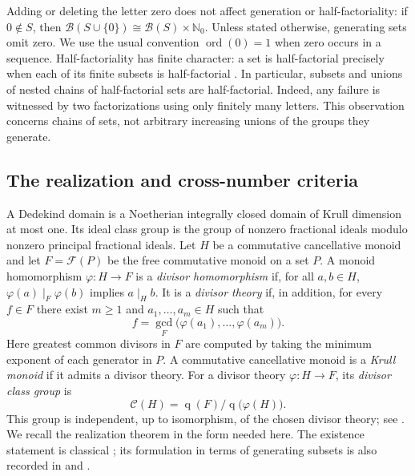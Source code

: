 \documentclass[11pt,reqno]{amsart}
\numberwithin{equation}{section}
\theoremstyle{definition}
\theoremstyle{remark}
\newcommand{\Nzero}{\mathbb N_0}
\newcommand{\B}{\mathcal B}
\DeclareMathOperator{\ord}{ord}
\begin{document}
Adding or deleting the letter zero does not affect generation or
half-factoriality: if $0\notin S$, then
$\B(S\cup\{0\})\cong\B(S)\times\Nzero$.
Unless stated otherwise, generating sets omit zero. We use the
usual convention $\ord(0)=1$ when zero occurs in a sequence.
Half-factoriality has finite character: a set is half-factorial
precisely when each of its finite subsets is half-factorial
\cite[Lemma~3.1]{GaoGeroldinger}. In particular, subsets and unions
of nested chains of half-factorial sets are half-factorial.
Indeed, any failure is witnessed by two factorizations using only
finitely many letters. This observation concerns chains of sets,
not arbitrary increasing unions of the groups they generate.

\subsection{The realization and cross-number criteria}

A Dedekind domain is a Noetherian integrally closed domain of
Krull dimension at most one. Its ideal class group is the group
of nonzero fractional ideals modulo nonzero principal fractional
ideals. 
Let $H$ be a commutative cancellative monoid and let
$F=\mathcal{F}(P)$ be the free commutative monoid on a set $P$.
A monoid homomorphism $\varphi:H\to F$ is a
\emph{divisor homomorphism} if, for all $a,b\in H$,
$\varphi(a)\mid_F\varphi(b)$ implies $a\mid_H b$.
It is a \emph{divisor theory} if, in addition, for every
$f\in F$ there exist $m\ge1$ and $a_1,\ldots,a_m\in H$ such that
\[
 f=\gcd_F\bigl(\varphi(a_1),\ldots,\varphi(a_m)\bigr).
\]
Here greatest common divisors in $F$ are computed by taking
the minimum exponent of each generator in $P$.
A commutative cancellative monoid is a \emph{Krull monoid}
if it admits a divisor theory. For a divisor theory
$\varphi:H\to F$, its \emph{divisor class group} is
\[
 \mathcal{C}(H)
 =\operatorname{q}(F)\big/
  \operatorname{q}\bigl(\varphi(H)\bigr).
\]
This group is independent, up to
isomorphism, of the chosen divisor theory; see \cite{GHK}.
We recall the realization theorem
in the form needed here. The existence statement is classical
\cite{Grams,ChapmanGeroldinger}; its formulation in terms of
generating subsets is also recorded in
\cite[p.~598]{GaoGeroldinger} and
\cite[p.~842]{GeroldingerGoebel}.
\end{document}
